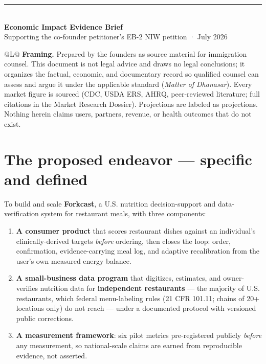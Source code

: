 \documentclass[10pt]{article}
\begin{document}
{\color{accent}\rule{2.6cm}{5pt}}\\[10pt]
{\huge\bfseries Economic Impact Evidence Brief}\\[4pt]
{\large\color{muted}Supporting the co-founder petitioner's EB-2 NIW petition · July 2026}\\[8pt]

\begin{tabularx}{\textwidth}{@{}L@{}}
\toprule
\textbf{Framing.} Prepared by the founders as source material for immigration counsel. This document is not legal
advice and draws no legal conclusions; it organizes the factual, economic, and documentary record so qualified
counsel can assess and argue it under the applicable standard (\emph{Matter of Dhanasar}). Every market figure is
sourced (CDC, USDA ERS, AHRQ, peer-reviewed literature; full citations in the Market Research Dossier). Projections
are labeled as projections. Nothing herein claims users, partners, revenue, or health outcomes that do not exist.\\
\bottomrule
\end{tabularx}

\section{The proposed endeavor --- specific and defined}

To build and scale \textbf{Forkcast}, a U.S. nutrition decision-support and data-verification system for restaurant
meals, with three components:

\begin{enumerate}[leftmargin=1.4em,itemsep=2pt]
\item \textbf{A consumer product} that scores restaurant dishes against an individual's clinically-derived targets
\emph{before} ordering, then closes the loop: order, confirmation, evidence-carrying meal log, and adaptive
recalibration from the user's own measured energy balance.
\item \textbf{A small-business data program} that digitizes, estimates, and owner-verifies nutrition data for
\textbf{independent restaurants} --- the majority of U.S. restaurants, which federal menu-labeling rules
(21 CFR 101.11; chains of 20+ locations only) do not reach --- under a documented protocol with versioned public
corrections.
\item \textbf{A measurement framework}: six pilot metrics pre-registered publicly \emph{before} any measurement,
so national-scale claims are earned from reproducible evidence, not asserted.
\end{enumerate}
\end{document}
